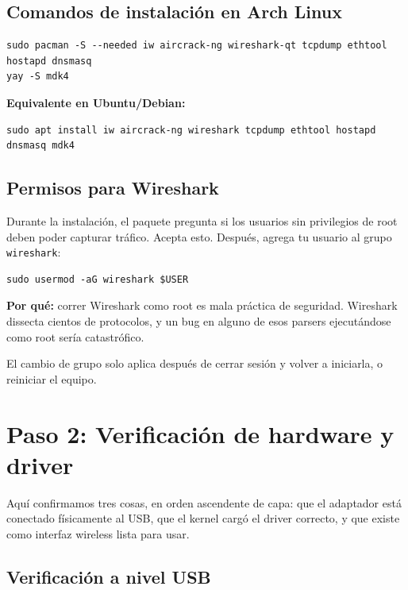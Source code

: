 \documentclass[11pt,a4paper]{article}
\begin{document}
\subsection{Comandos de instalación en Arch Linux}

\begin{lstlisting}
sudo pacman -S --needed iw aircrack-ng wireshark-qt tcpdump ethtool hostapd dnsmasq
yay -S mdk4
\end{lstlisting}

\textbf{Equivalente en Ubuntu/Debian:}

\begin{lstlisting}
sudo apt install iw aircrack-ng wireshark tcpdump ethtool hostapd dnsmasq mdk4
\end{lstlisting}

\subsection{Permisos para Wireshark}
Durante la instalación, el paquete pregunta si los usuarios sin
privilegios de root deben poder capturar tráfico. Acepta esto. Después,
agrega tu usuario al grupo \texttt{wireshark}:

\begin{lstlisting}
sudo usermod -aG wireshark $USER
\end{lstlisting}

\textbf{Por qué:} correr Wireshark como root es mala práctica de
seguridad. Wireshark dissecta cientos de protocolos, y un bug en alguno
de esos parsers ejecutándose como root sería catastrófico.

El cambio de grupo solo aplica después de cerrar sesión y volver a
iniciarla, o reiniciar el equipo.

\section{Paso 2: Verificación de hardware y driver}

Aquí confirmamos tres cosas, en orden ascendente de capa: que el adaptador
está conectado físicamente al USB, que el kernel cargó el driver correcto,
y que existe como interfaz wireless lista para usar.

\subsection{Verificación a nivel USB}
\end{document}
